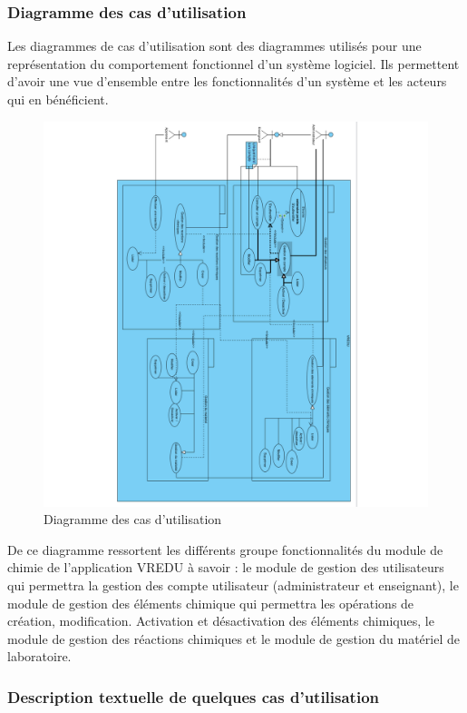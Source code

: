 \subsubsection{Diagramme des cas d’utilisation}

Les diagrammes de cas d'utilisation sont des diagrammes utilisés pour une représentation du comportement fonctionnel d'un système logiciel. Ils permettent d’avoir une vue d’ensemble entre les fonctionnalités d’un système et les acteurs qui en bénéficient. 

\begin{figure}[H]
	\centering
	\includegraphics[trim={10cm 0 0 0}, width=1\textwidth]{img/ucd}
	\caption{Diagramme des cas d’utilisation}
	\label{fig:mesh1}
\end{figure}

De ce diagramme ressortent les différents groupe fonctionnalités du module de chimie de l’application VREDU à savoir :  le module de gestion des utilisateurs qui permettra la gestion des compte utilisateur (administrateur et enseignant), le module de gestion des éléments chimique qui permettra les opérations de création, modification. Activation et désactivation des éléments chimiques, le module de gestion des réactions chimiques et le module de gestion du matériel de laboratoire.

\subsubsection{Description textuelle de quelques cas d’utilisation}

